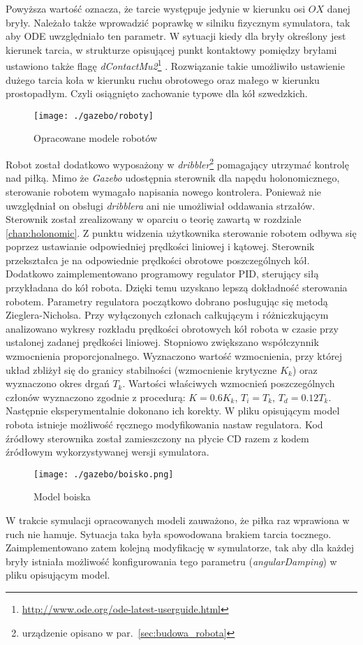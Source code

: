 	Powyższa wartość oznacza, że tarcie występuje jedynie w kierunku osi $OX$ danej bryły.
	Należało także wprowadzić poprawkę w silniku fizycznym symulatora, tak aby ODE uwzględniało ten parametr. W sytuacji kiedy dla bryły określony jest kierunek tarcia,
	w strukturze opisującej punkt kontaktowy pomiędzy bryłami ustawiono także flagę \textit{dContactMu2}\protect\footnote{\url{http://www.ode.org/ode-latest-userguide.html}} .
	Rozwiązanie takie umożliwiło ustawienie dużego tarcia koła  w kierunku ruchu obrotowego oraz małego
	w kierunku prostopadłym. Czyli osiągnięto zachowanie typowe dla kół szwedzkich.
	\begin{figure}[H]
	\centering
	\texttt{[image: ./gazebo/roboty]}
	\caption{Opracowane modele robotów  \label{fig:robots}}
	\end{figure}
	Robot został dodatkowo wyposażony w \textit{dribbler}\protect\footnote{urządzenie opisano w par.~\ref{sec:budowa_robota}} pomagający utrzymać kontrolę nad piłką.
	Mimo że \textit{Gazebo} udostępnia sterownik dla napędu holonomicznego, sterowanie robotem wymagało napisania nowego kontrolera. Ponieważ nie uwzględniał on obsługi
	\textit{dribblera} ani nie umożliwiał oddawania strzałów. Sterownik został zrealizowany w oparciu o teorię zawartą w rozdziale \ref{chap:holonomic}. Z punktu widzenia użytkownika
	sterowanie robotem odbywa się poprzez ustawianie odpowiedniej prędkości liniowej i kątowej. Sterownik przekształca je na odpowiednie prędkości obrotowe poszczególnych kół.
	Dodatkowo zaimplementowano programowy regulator PID, sterujący siłą przykładana do kół robota. Dzięki temu uzyskano lepszą dokładność sterowania robotem.
	Parametry regulatora początkowo dobrano posługując się metodą Zieglera-Nicholsa. Przy wyłączonych członach całkującym i różniczkującym analizowano wykresy rozkładu
	prędkości obrotowych kół robota w czasie przy ustalonej zadanej prędkości liniowej. Stopniowo zwiększano współczynnik wzmocnienia proporcjonalnego. Wyznaczono wartość wzmocnienia,
	przy której układ zbliżył się do granicy stabilności (wzmocnienie krytyczne $K_k$) oraz wyznaczono okres drgań $T_k$. 
	Wartości właściwych wzmocnień poszczególnych  członów wyznaczono zgodnie z procedurą: $K=0.6K_k$, $T_i=T_k$, $T_d=0.12T_k$. Następnie eksperymentalnie dokonano ich korekty.
	W pliku opisującym model robota istnieje możliwość ręcznego modyfikowania nastaw regulatora.
	Kod źródłowy sterownika został zamieszczony na płycie CD razem z kodem źródłowym wykorzystywanej wersji symulatora.	
	\begin{figure}[H]
	\centering
	\texttt{[image: ./gazebo/boisko.png]}
	\caption{Model boiska}
	\end{figure}
	W trakcie symulacji opracowanych modeli zauważono, że piłka raz wprawiona w ruch nie hamuje. Sytuacja taka była spowodowana brakiem tarcia tocznego. Zaimplementowano zatem kolejną modyfikację w 
	symulatorze, tak aby dla każdej bryły istniała możliwość konfigurowania tego parametru (\textit{angularDamping}) w pliku opisującym model.

